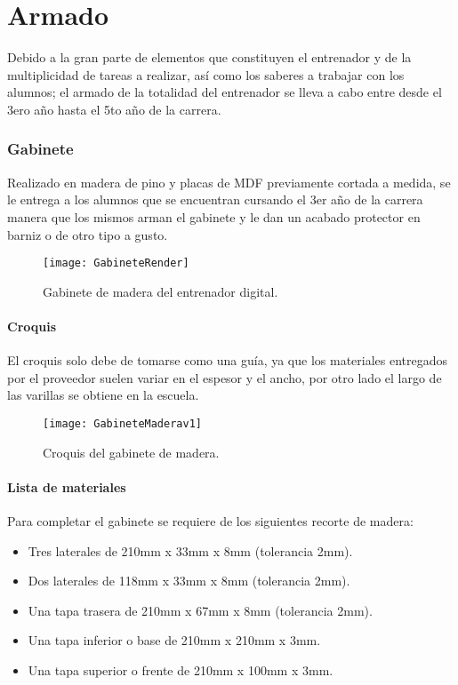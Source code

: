 \part{Armado}
Debido a la gran parte de elementos que constituyen el entrenador y de la multiplicidad de tareas a realizar, así como los saberes a trabajar con los alumnos; el armado de la totalidad del entrenador se lleva a cabo entre desde el 3ero año hasta el 5to año de la carrera.   
\section{Gabinete}
\begin{multicols}{2}
Realizado en madera de pino y placas de MDF previamente cortada a medida, se le entrega a los alumnos que se encuentran cursando el 3er año de la carrera manera que los mismos arman el gabinete y le dan un acabado protector en barniz o de otro tipo a gusto.
\begin{figure}[H]
	\texttt{[image: GabineteRender]}\caption{Gabinete de madera del entrenador digital.}\label{GabineteRender}

\end{figure}

\end{multicols}
\subsection{Croquis}
El croquis solo debe de tomarse como una guía, ya que los materiales entregados por el proveedor suelen variar en el espesor y el ancho, por otro lado el largo de las varillas se obtiene en la escuela. 

\begin{figure}[h!]
\texttt{[image: GabineteMaderav1]}\caption{Croquis del gabinete de madera.}\label{CroquisdelGabinetedeMadera}
\end{figure}
\subsection{Lista de materiales}
Para completar el gabinete se requiere de los siguientes recorte de madera:
\begin{itemize}
	\item Tres laterales de 210mm x 33mm x 8mm (tolerancia 2mm).
	\item Dos laterales de 118mm x 33mm x 8mm (tolerancia 2mm).
	\item Una tapa trasera de 210mm x 67mm x 8mm (tolerancia 2mm).
	\item Una tapa inferior o base de 210mm x 210mm x 3mm.
	\item Una tapa superior o frente de 210mm x 100mm x 3mm.
	 
\end{itemize}

